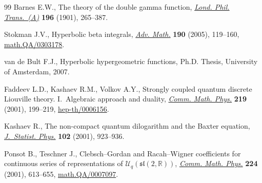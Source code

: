 \documentclass[11pt]{article}
\numberwithin{equation}{section}
\newcommand{\R}{{\mathbb R}}
\begin{document}
\begin{thebibliography}{99}
Barnes E.W.,
The theory of the double gamma function,
\href{http://dx.doi.org/10.1098/rsta.1901.0006}{{\it Lond. Phil. Trans.~(A)}} {\bf 196} (1901), 265--387.

Stokman J.V.,
Hyperbolic beta integrals,
\href{http://dx.doi.org/10.1016/j.aim.2003.12.003}{{\it Adv. Math.}} {\bf 190} (2005), 119--160,
\href{http://arxiv.org/abs/math.QA/0303178}{math.QA/0303178}.

van de Bult F.J.,
Hyperbolic hypergeometric functions,
 Ph.D. Thesis, University of Amsterdam, 2007.

Faddeev L.D., Kashaev R.M., Volkov A.Y.,
Strongly coupled quantum discrete Liouville theory. I.~Algebraic approach and duality,
\href{http://dx.doi.org/10.1007/s002200100412}{{\it Comm. Math. Phys.}} {\bf 219} (2001), 199--219,
\href{http://arxiv.org/abs/hep-th/0006156}{hep-th/0006156}.

Kashaev R.,
The non-compact quantum dilogarithm and the Baxter equation,
\href{http://dx.doi.org/10.1023/A:1004859121464}{{\it J.~Statist. Phys.}} {\bf 102} (2001), 923--936.

Ponsot B.,  Teschner J.,
Clebsch--Gordan and Racah--Wigner coef\/f\/icients for continuous series of representations of ${\mathcal U}_q(\mathfrak{sl}(2,\R))$,
\href{http://dx.doi.org/10.1007/PL00005590}{{\it Comm. Math. Phys.}} {\bf 224} (2001), 613--655,
\href{http://arxiv.org/abs/math.QA/0007097}{math.QA/0007097}.

\end{thebibliography}
\end{document}
